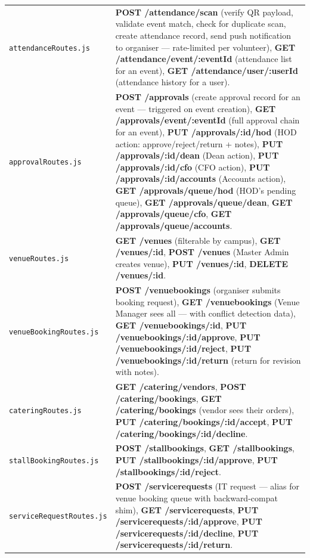 \documentclass[12pt,a4paper]{article}
\begin{document}
\begin{longtable}{L{5cm} X}
\texttt{attendanceRoutes.js} & \textbf{POST /attendance/scan} (verify QR payload, validate event match, check for duplicate scan, create attendance record, send push notification to organiser — rate-limited per volunteer), \textbf{GET /attendance/event/:eventId} (attendance list for an event), \textbf{GET /attendance/user/:userId} (attendance history for a user). \\
\addlinespace
\texttt{approvalRoutes.js} & \textbf{POST /approvals} (create approval record for an event — triggered on event creation), \textbf{GET /approvals/event/:eventId} (full approval chain for an event), \textbf{PUT /approvals/:id/hod} (HOD action: approve/reject/return + notes), \textbf{PUT /approvals/:id/dean} (Dean action), \textbf{PUT /approvals/:id/cfo} (CFO action), \textbf{PUT /approvals/:id/accounts} (Accounts action), \textbf{GET /approvals/queue/hod} (HOD's pending queue), \textbf{GET /approvals/queue/dean}, \textbf{GET /approvals/queue/cfo}, \textbf{GET /approvals/queue/accounts}. \\
\addlinespace
\texttt{venueRoutes.js} & \textbf{GET /venues} (filterable by campus), \textbf{GET /venues/:id}, \textbf{POST /venues} (Master Admin creates venue), \textbf{PUT /venues/:id}, \textbf{DELETE /venues/:id}. \\
\addlinespace
\texttt{venueBookingRoutes.js} & \textbf{POST /venuebookings} (organiser submits booking request), \textbf{GET /venuebookings} (Venue Manager sees all — with conflict detection data), \textbf{GET /venuebookings/:id}, \textbf{PUT /venuebookings/:id/approve}, \textbf{PUT /venuebookings/:id/reject}, \textbf{PUT /venuebookings/:id/return} (return for revision with notes). \\
\addlinespace
\texttt{cateringRoutes.js} & \textbf{GET /catering/vendors}, \textbf{POST /catering/bookings}, \textbf{GET /catering/bookings} (vendor sees their orders), \textbf{PUT /catering/bookings/:id/accept}, \textbf{PUT /catering/bookings/:id/decline}. \\
\addlinespace
\texttt{stallBookingRoutes.js} & \textbf{POST /stallbookings}, \textbf{GET /stallbookings}, \textbf{PUT /stallbookings/:id/approve}, \textbf{PUT /stallbookings/:id/reject}. \\
\addlinespace
\texttt{serviceRequestRoutes.js} & \textbf{POST /servicerequests} (IT request — alias for venue booking queue with backward-compat shim), \textbf{GET /servicerequests}, \textbf{PUT /servicerequests/:id/approve}, \textbf{PUT /servicerequests/:id/decline}, \textbf{PUT /servicerequests/:id/return}. \\

\end{longtable}
\end{document}
